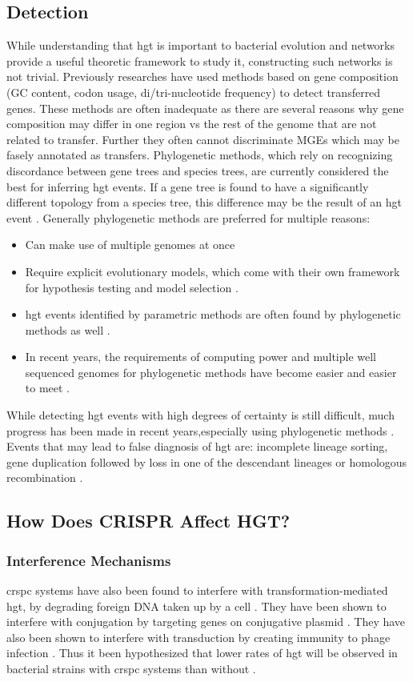 \subsection{Detection}
While understanding that \ac{hgt} is important to bacterial evolution and networks provide a useful theoretic framework to study it, constructing such networks is not trivial.
Previously researches have used methods based on gene composition (GC content, codon usage, di/tri-nucleotide frequency) to detect transferred genes.
These methods are often inadequate as there are several reasons why gene composition may differ in one region vs the rest of the genome that are not related to transfer.
Further they often cannot discriminate \ac{MGE}s which may be fasely annotated as transfers.
Phylogenetic methods, which rely on recognizing discordance between gene trees and species trees, are currently considered the best for inferring \ac{hgt} events.
If a gene tree is found to have a significantly different topology from a species tree, this difference may be the result of an \ac{hgt} event \citep{hgterr}.
Generally phylogenetic methods are preferred for multiple reasons:
\begin{itemize}
    \item Can make use of multiple genomes at once \citep{ihgt}
    \item Require explicit evolutionary models, which come with their own framework for hypothesis testing and model selection \citep{ihgt}.
    \item \ac{hgt} events identified by parametric methods are often found by phylogenetic methods as well \citep{ihgt}.
    \item In recent years, the requirements of computing power and  multiple well sequenced genomes for phylogenetic methods have become easier and easier to meet \citep{ihgt}.
\end{itemize}
While detecting \ac{hgt} events with high degrees of certainty is still difficult, much progress has been made in recent years,especially using phylogenetic methods \citep{ihgt}.
Events that may lead to false diagnosis of \ac{hgt} are: incomplete lineage sorting, gene duplication followed by loss in one of the descendant lineages or homologous recombination \citep{ihgt,hgterr}.

\subsection{How Does CRISPR Affect HGT?}
\subsubsection{Interference Mechanisms}
\ac{crspc} systems have also been found to interfere with transformation-mediated \ac{hgt}, by degrading foreign DNA taken up by a cell \citep{climtrans}.
They have been shown to interfere with conjugation by targeting genes on conjugative plasmid \citep{staphlim}.
They have also been shown to interfere with transduction by creating immunity to phage infection \citep{staphlim}.
Thus it been hypothesized that lower rates of \ac{hgt} will be observed in bacterial strains with \ac{crspc} systems than without \citep{staphlim}.
